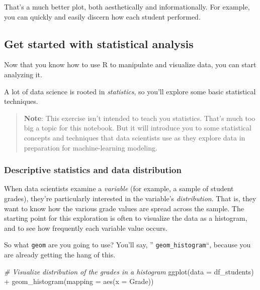 \documentclass[
]{article}
\newenvironment{Shaded}{\begin{snugshade}}{\end{snugshade}}
\newcommand{\AttributeTok}[1]{\textcolor[rgb]{0.77,0.63,0.00}{#1}}
\newcommand{\CommentTok}[1]{\textcolor[rgb]{0.56,0.35,0.01}{\textit{#1}}}
\newcommand{\FunctionTok}[1]{\textcolor[rgb]{0.00,0.00,0.00}{#1}}
\newcommand{\NormalTok}[1]{#1}
\newcommand{\SpecialCharTok}[1]{\textcolor[rgb]{0.00,0.00,0.00}{#1}}
\begin{document}
That's a much better plot, both aesthetically and informationally. For
example, you can quickly and easily discern how each student performed.

\hypertarget{get-started-with-statistical-analysis}{%
\subsection{Get started with statistical
analysis}\label{get-started-with-statistical-analysis}}

Now that you know how to use R to manipulate and visualize data, you can
start analyzing it.

A lot of data science is rooted in \emph{statistics}, so you'll explore
some basic statistical techniques.

\begin{quote}
\textbf{Note}: This exercise isn't intended to teach you statistics.
That's much too big a topic for this notebook. But it will introduce you
to some statistical concepts and techniques that data scientists use as
they explore data in preparation for machine-learning modeling.
\end{quote}

\hypertarget{descriptive-statistics-and-data-distribution}{%
\subsubsection{Descriptive statistics and data
distribution}\label{descriptive-statistics-and-data-distribution}}

When data scientists examine a \emph{variable} (for example, a sample of
student grades), they're particularly interested in the variable's
\emph{distribution}. That is, they want to know how the various grade
values are spread across the sample. The starting point for this
exploration is often to visualize the data as a histogram, and to see
how frequently each variable value occurs.

So what \texttt{geom} are you going to use? You'll say, ''
\texttt{geom\_histogram}``, because you are already getting the hang of
this.

\begin{Shaded}
\begin{Highlighting}[]
\CommentTok{\# Visualize distribution of the grades in a histogram}
\FunctionTok{ggplot}\NormalTok{(}\AttributeTok{data =}\NormalTok{ df\_students) }\SpecialCharTok{+}
  \FunctionTok{geom\_histogram}\NormalTok{(}\AttributeTok{mapping =} \FunctionTok{aes}\NormalTok{(}\AttributeTok{x =}\NormalTok{ Grade))}
\end{Highlighting}
\end{Shaded}
\end{document}
